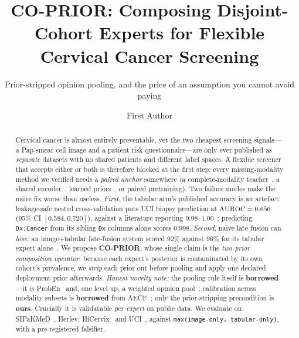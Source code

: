 \documentclass[sigplan,nonacm,screen]{acmart}
\begin{document}
\title{CO-PRIOR: Composing Disjoint-Cohort Experts for Flexible Cervical Cancer Screening}
\subtitle{Prior-stripped opinion pooling, and the price of an assumption you cannot avoid paying}

\author{First Author}
\renewcommand{\shortauthors}{Author et al.}

\begin{abstract}
Cervical cancer is almost entirely preventable, yet the two cheapest screening signals---a Pap-smear cell image and a patient risk questionnaire---are only ever published as \emph{separate} datasets with no shared patients and different label spaces. A flexible screener that accepts either or both is therefore blocked at the first step: every missing-modality method we verified needs a \emph{paired anchor} somewhere (a complete-modality teacher~\cite{wei2023mmanet}, a shared encoder~\cite{wang2023shaspec}, learned priors~\cite{ma2021smil}, or paired pretraining). Two failure modes make the naive fix worse than useless. \emph{First}, the tabular arm's published accuracy is an artefact: leakage-safe nested cross-validation puts UCI biopsy prediction at $\mathrm{AUROC}=0.656$ (95\% CI $[0.584,0.720]$), against a literature reporting $0.98$--$1.00$~\cite{roy2025interpretable}; predicting \texttt{Dx:Cancer} from its sibling \texttt{Dx} columns alone scores $0.998$. \emph{Second}, naive late fusion can \emph{lose}: an image$+$tabular late-fusion system scored $92\%$ against $96\%$ for its tabular expert alone~\cite{kelebet2025multimodal}. We propose \textbf{CO-PRIOR}, whose single claim is the \emph{two-prior composition operator}: because each expert's posterior is contaminated by its own cohort's prevalence, we \emph{strip} each prior out before pooling and apply one declared deployment prior afterwards. \emph{Honest novelty note:} the pooling rule itself is \textbf{borrowed}---it is ProbEn~\cite{chen2022proben} and, one level up, a weighted opinion pool~\cite{genest1986combining}; calibration across modality subsets is \textbf{borrowed} from AECF~\cite{chlon2025aecf}; only the prior-stripping precondition is \textbf{ours}. Crucially it is validatable \emph{per expert} on public data. We evaluate on SIPaKMeD~\cite{plissiti2018sipakmed}, Herlev, HiCervix~\cite{cai2024hicervix} and UCI~\cite{fernandes2017transfer}, against \texttt{max(image-only, tabular-only)}, with a pre-registered falsifier.
\end{abstract}
\end{document}
